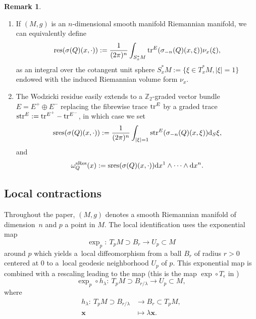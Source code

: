 \documentclass[10pt,a4paper]{amsart}
\numberwithin{equation}{section}
\theoremstyle{definition}
\newtheorem{rk}[thm]{Remark}
\newcommand{\Z}{\mathbb Z}
\begin{document}
\begin{rk}\quad
\begin{enumerate}\itemsep=0pt
\item If $(M, g)$ is an $n$-dimensional smooth manifold Riemannian manifold, we can equivalently define
\[
{\rm res}(\sigma(Q)(x,\cdot)):=\frac{1}{(2\pi)^n} \int_{S_x^*M}{\rm tr}^E(\sigma_{-n}(Q) (x, \xi)) \nu_x(\xi),
\]
as an integral over the cotangent unit sphere $S_x^* M:=\{\xi\in T_x^*M, \vert \xi\vert=1\}$ endowed with the induced Riemannian volume form $\nu_x$.
\item The Wodzicki residue easily extends to a $\Z_2$-graded vector bundle $E=E^+\oplus E^-$ replacing the fibrewise trace ${\rm tr}^E$ by a graded trace ${\rm str}^E:= {\rm tr}^{E^+}- {\rm tr}^{E^-}$, in which case we set
\[
{\rm sres}(\sigma(Q)(x,\cdot)):=\frac{1}{(2\pi)^n} \int_{|\xi|=1}{\rm str}^E(\sigma_{-n}(Q) (x, \xi)) {\rm d}_S\xi,
\]
and
\[
\omega_Q^{\rm sRes}(x):= {\rm sres}(\sigma(Q)(x,\cdot)) {\rm d}x^1\wedge\dots \wedge {\rm d}x^n.
\]
\end{enumerate}\end{rk}

\subsection{Local contractions}
Throughout the paper, $(M, g)$ denotes a smooth Riemannian manifold of dimension~$n$ and $p$ a point in $M$. The local identification uses the exponential map
\begin{equation}\label{eq:expp}
\exp_{p}\colon \ T_{p}M\supset B_r\longrightarrow U_{p}\subset M
\end{equation}
around $p$ which yields a~local diffeomorphism from a ball $B_r$ of radius $r>0$ centered at $0$ to a~local geodesic neighborhood $U_p$ of $p$.
This exponential map is combined with a rescaling leading to the map (this is the map $\exp\circ T_\epsilon$ in \cite[formula (4.4.7)]{F})
\begin{equation*}
\exp_{p} \circ h_\lambda\colon \ T_{p}M\supset B_{r/\lambda}\longrightarrow U_{p}\subset M,
\end{equation*}
where
\begin{align*}
h_\lambda\colon \ T_{p} M\supset B_{r/\lambda} &\longrightarrow B_r\subset T_{p}M, \\
	{\mathbf x} & \longmapsto \lambda {\mathbf x}.
\end{align*}
\end{document}
